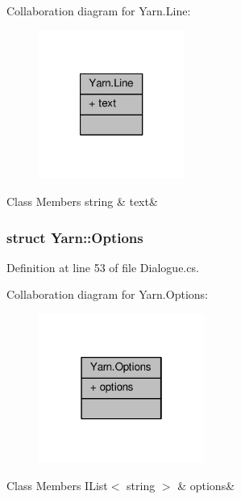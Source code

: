 Collaboration diagram for Yarn.\-Line\-:
\nopagebreak
\begin{figure}[H]
\begin{center}
\leavevmode
\includegraphics[width=136pt]{a00378}
\end{center}
\end{figure}
\begin{DoxyFields}{Class Members}
\hypertarget{a00045_a81d1f04bbb4cf6642d2bd685bda1da20}{string}\label{a00045_a81d1f04bbb4cf6642d2bd685bda1da20}
&
text&
\\
\hline

\end{DoxyFields}
\label{a00368}
\hypertarget{a00045_a00368}{}
\subsubsection{struct Yarn\-:\-:Options}


Definition at line 53 of file Dialogue.\-cs.



Collaboration diagram for Yarn.\-Options\-:
\nopagebreak
\begin{figure}[H]
\begin{center}
\leavevmode
\includegraphics[width=154pt]{a00379}
\end{center}
\end{figure}
\begin{DoxyFields}{Class Members}
\hypertarget{a00045_ae8c616d923ceeeed192a9436c55d9917}{I\-List$<$ string $>$}\label{a00045_ae8c616d923ceeeed192a9436c55d9917}
&
options&
\\
\hline

\end{DoxyFields}
\label{a00361}
\hypertarget{a00045_a00361}{}
